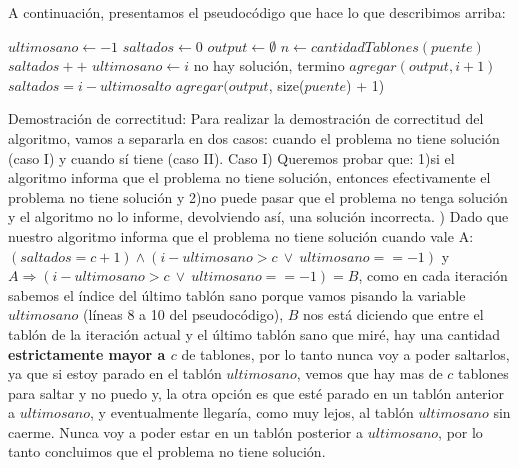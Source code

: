 \documentclass{article}
\begin{document}
A continuaci\'on, presentamos el pseudoc\'odigo que hace lo que describimos arriba:
\vspace{0.4cm}
\begin{algorithmic}[1]
	\State $ultimosano\gets -1$
	\State $saltados\gets 0$
	\State $output\gets \emptyset$
	\State $n\gets cantidadTablones(puente)$
		\State $saltados++$
			\State $ultimosano\gets i$
		\EndIf
				\State no hay soluci\'on, termino
			\EndIf
			\State $agregar(output, i + 1)$
			\State $saltados = i - ultimosalto$
		\EndIf
	\EndFor
	\State $agregar(output$, size($puente$) + 1)
\EndProcedure
\end{algorithmic}
\vspace{1cm}
{\noindent \Huge Demostraci\'on de correctitud:}
\newline
\newline Para realizar la demostraci\'on de correctitud del algoritmo, vamos a separarla en dos casos: cuando el problema no tiene soluci\'on (caso I) y cuando s\'i tiene (caso II).
\newline
\newline Caso I) Queremos probar que: 1)si el algoritmo informa que el problema no tiene soluci\'on, entonces efectivamente el problema no tiene soluci\'on y 2)no puede pasar que el problema no tenga soluci\'on y el algoritmo no lo informe, devolviendo as\'i, una soluci\'on incorrecta.
) Dado que nuestro algoritmo informa que el problema no tiene soluci\'on cuando vale A: $(saltados = c + 1) \wedge (i - ultimosano > c \ \vee \ ultimosano == -1)$ y $A\Rightarrow (i - ultimosano > c \ \vee \ ultimosano == -1) = B$, como en cada iteraci\'on sabemos el \'indice del \'ultimo tabl\'on sano porque vamos pisando la variable $ultimosano$ (l\'ineas 8 a 10 del pseudoc\'odigo), $B$ nos est\'a diciendo que entre el tabl\'on de la iteraci\'on actual y el \'ultimo tabl\'on sano que mir\'e, hay una cantidad \textbf{estrictamente mayor a $c$} de tablones, por lo tanto nunca voy a poder saltarlos, ya que si estoy parado en el tabl\'on $ultimosano$, vemos que hay mas de $c$ tablones para saltar y no puedo y, la otra opci\'on es que est\'e parado en un tabl\'on anterior a $ultimosano$, y eventualmente llegar\'ia, como muy lejos, al tabl\'on $ultimosano$ sin caerme. Nunca voy a poder estar en un tabl\'on posterior a $ultimosano$, por lo tanto concluimos que el problema no tiene soluci\'on.
\end{document}
